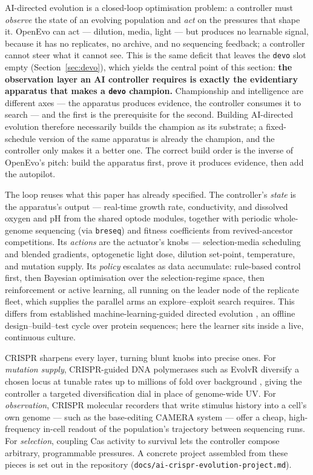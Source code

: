 \documentclass[11pt,a4paper]{article}
\newcommand{\code}[1]{\texttt{\small #1}}
\begin{document}
AI-directed evolution is a closed-loop optimisation problem: a controller must \emph{observe} the
state of an evolving population and \emph{act} on the pressures that shape it. OpenEvo can
act --- dilution, media, light --- but produces no learnable signal, because it has no replicates,
no archive, and no sequencing feedback; a controller cannot steer what it cannot see. This is the
same deficit that leaves the \texttt{devo} slot empty (Section~\ref{sec:devo}), which yields the
central point of this section: \textbf{the observation layer an AI controller requires is exactly
the evidentiary apparatus that makes a \texttt{devo} champion.} Championship and intelligence are
different axes --- the apparatus produces evidence, the controller consumes it to search --- and
the first is the prerequisite for the second. Building AI-directed evolution therefore necessarily
builds the champion as its substrate; a fixed-schedule version of the same apparatus is already
the champion, and the controller only makes it a better one. The correct build order is the inverse
of OpenEvo's pitch: build the apparatus first, prove it produces evidence, then add the autopilot.

The loop reuses what this paper has already specified. The controller's \emph{state} is the
apparatus's output --- real-time growth rate, conductivity, and dissolved oxygen and pH from the
shared optode modules, together with periodic whole-genome sequencing (via \code{breseq}) and
fitness coefficients from revived-ancestor competitions. Its \emph{actions} are the actuator's
knobs --- selection-media scheduling and blended gradients, optogenetic light dose, dilution
set-point, temperature, and mutation supply. Its \emph{policy} escalates as data
accumulate: rule-based control first, then Bayesian optimisation over the selection-regime space,
then reinforcement or active learning, all running on the leader node of the replicate fleet, which
supplies the parallel arms an explore--exploit search requires. This differs from established
machine-learning-guided directed evolution \cite{yang2019ml}, an offline design--build--test cycle
over protein sequences; here the learner sits inside a live, continuous culture.

CRISPR sharpens every layer, turning blunt knobs into precise ones. For \emph{mutation supply},
CRISPR-guided DNA polymerases such as EvolvR diversify a chosen locus at tunable rates up to
millions of fold over background \cite{halperin2018evolvr}, giving the controller a targeted
diversification dial in place of genome-wide UV. For \emph{observation}, CRISPR molecular recorders
that write stimulus history into a cell's own genome --- such as the base-editing CAMERA system
\cite{tang2018camera} --- offer a cheap, high-frequency in-cell readout of the population's
trajectory between sequencing runs. For \emph{selection}, coupling Cas activity to survival lets the
controller compose arbitrary, programmable pressures. A concrete project assembled from these pieces
is set out in the repository (\code{docs/ai-crispr-evolution-project.md}).
\end{document}

